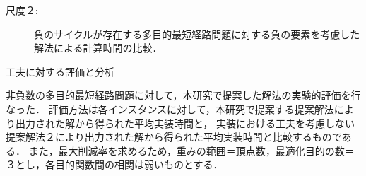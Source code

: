 \documentclass[12pt]{optlab-bachelor}
\begin{document}
\begin{description}
  \item[尺度２:]
  負のサイクルが存在する多目的最短経路問題に対する負の要素を考慮した解法による計算時間の比較．


\end{description}

\begin{description}
  \item[工夫に対する評価と分析]
\end{description}

非負数の多目的最短経路問題に対して，本研究で提案した解法の実験的評価を行なった．
評価方法は各インスタンスに対して，本研究で提案する提案解法により出力された解から得られた平均実装時間と，
実装における工夫を考慮しない提案解法２により出力された解から得られた平均実装時間と比較するものである．
また，最大削減率を求めるため，重みの範囲＝頂点数，最適化目的の数＝３とし，各目的関数間の相関は弱いものとする．
\end{document}
